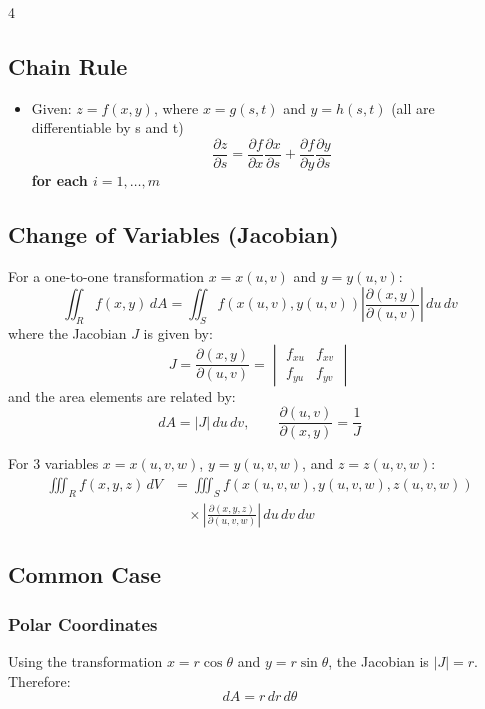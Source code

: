 \documentclass[8pt, landscape, a4paper]{scrartcl}
\begin{document}
\begin{multicols*}{4}
    \subsection*{Chain Rule}
    \begin{itemize}
        \item Given: $z = f(x,y)$, where $x = g(s,t)$ and $y = h(s, t)$ (all are differentiable by s and t)
        \[\frac{\partial z}{\partial s} = \frac{\partial f}{\partial x} \frac{\partial x}{\partial s} + \frac{\partial f}{\partial y}\frac{\partial y}{\partial s}\]
        \textbf{for each $i = 1, \dots, m$}
    \end{itemize}

   \subsection*{Change of Variables (Jacobian)}

For a one-to-one transformation $x = x(u,v)$ and $y = y(u,v)$:
\[
    \iint_R f(x,y) \, dA
    =
    \iint_S f(x(u,v), y(u,v)) \left| \frac{\partial(x,y)}{\partial(u,v)} \right| \, du \, dv
\]
where the Jacobian $J$ is given by:
\[
    J = \frac{\partial(x,y)}{\partial(u,v)}
    =
    \begin{vmatrix}
        f_{xu} & f_{xv} \\[1ex]
        f_{yu} & f_{yv}
    \end{vmatrix}
\]
and the area elements are related by:
\[
    dA = |J| \, du \, dv,
    \qquad
    \frac{\partial(u,v)}{\partial(x,y)} = \frac{1}{J}
\]

For 3 variables $x = x(u,v,w)$, $y = y(u,v,w)$, and $z = z(u,v,w)$:
\begin{align*}
    \iiint_R f(x,y,z) \, dV
    &= \iiint_S f(x(u,v,w), y(u,v,w), z(u,v,w)) \\
    &\quad \times \left| \frac{\partial(x,y,z)}{\partial(u,v,w)} \right| \, du \, dv \, dw
\end{align*}

\subsection*{Common Case}
\subsubsection*{Polar Coordinates}

Using the transformation $x = r\cos\theta$ and $y = r\sin\theta$, the Jacobian is $|J| = r$. Therefore:
\[
    dA = r \, dr \, d\theta
\]


\end{multicols*}
\end{document}
